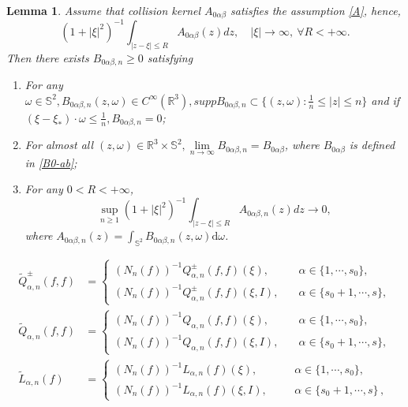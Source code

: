 \documentclass[10pt,a4paper]{amsart}
\newtheorem{lemma}{Lemma}
\def\R{\mathbb{R}}
\def\d{\mathrm{d}}
\begin{document}
	\begin{lemma}\label{Lemma 4.12}
	Assume that collision kernel $A_{0\alpha \beta }$ satisfies the assumption \eqref{A}, hence,
	\begin{equation*}
		(1+|\xi|^2)^{-1} \int_{|z-\xi |\leq R } A_{0\alpha \beta } (z)dz, \quad |\xi|\rightarrow \infty, \ \forall R <+\infty .
	\end{equation*}	
	Then there exists $B_{0\alpha \beta ,n }\geq 0 $ satisfying
	\begin{enumerate}
		\item {For any $\omega\in \mathbb{S}^2, B_{0\alpha \beta ,n } (z,\omega ) \in C^\infty (\R^3 ),supp B_{0\alpha \beta , n} \subset \{(z,\omega ): \frac{1}{n} \leq |z| \leq n \}$ and if $ (\xi -\xi_* ) \cdot \omega \leq \frac{1}{n} , B_{0\alpha \beta ,n } =0$;}\label{1 of Lemma 4.12}
		\item  {For almost all $(z,\omega )\in \R^3 \times \mathbb{S}^2 , \lim \limits_{n\rightarrow \infty } B_{0\alpha \beta ,n } =B_{0\alpha \beta }$, where $B_{0\alpha \beta }$ is defined in \eqref{B0-ab};} \label{2 of Lemma 4.12}
		\item {For any $0 < R < + \infty$,
			\begin{equation*}
				\sup \limits_{n \geq 1} (1+|\xi|^2 )^{-1} \int_{|z-\xi |\leq R } A_{0\alpha \beta ,n } (z) dz \rightarrow 0 ,
		\end{equation*}	
where $A_{0 \alpha \beta , n} (z) = \int_{ \mathbb{S}^2 } B_{0 \alpha \beta, n} (z, \omega) \d \omega$. }\label{3 of Lemma 4.12}
	\end{enumerate}
\end{lemma}	

\begin{equation}\label{Q L}
	\begin{aligned}
		\tilde{Q}^\pm _{\alpha ,n } (f,f) &=
		\begin{cases}
			( N_n (f) )^{-1} Q^\pm _{\alpha ,n } (f,f)(\xi ), \quad &\alpha \in \{1,\cdots, s_0 \},\\
			( N_n (f) )^{-1} Q^\pm _{\alpha ,n } (f,f)(\xi ,I ), \quad &\alpha \in \{s_0+1,\cdots, s \},
		\end{cases} \\
			\tilde{Q}_{\alpha ,n } (f,f) &=
		\begin{cases}
			( N_n (f) )^{-1} Q_{\alpha ,n } (f,f)(\xi ), \quad &\alpha \in \{1,\cdots, s_0 \},\\
			( N_n (f) )^{-1} Q_{\alpha ,n } (f,f)(\xi ,I ), \quad &\alpha \in \{s_0+1,\cdots, s \},
		\end{cases}\\
		\tilde{L} _{\alpha ,n } (f) &=
		\begin{cases}
			( N_n (f) )^{-1} L _{\alpha ,n } (f)(\xi ), \quad & \ \ \ \alpha \in \{1,\cdots, s_0 \},\\
			( N_n (f) )^{-1} L _{\alpha ,n } (f)(\xi ,I ), \quad & \ \ \ \alpha \in \{s_0+1,\cdots, s \} \,, 
		\end{cases}
	\end{aligned}
\end{equation}
\end{document}
